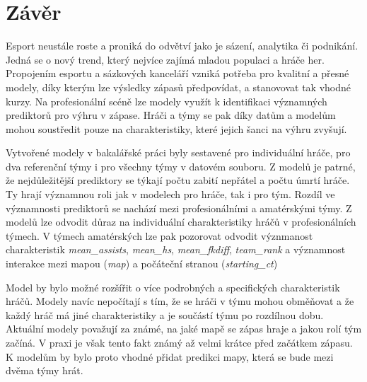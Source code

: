 \chapter{Závěr}
Esport neustále roste a proniká do odvětví jako je sázení, analytika či podnikání. Jedná se o nový trend, který nejvíce zajímá  mladou populaci a hráče her.
Propojením esportu a sázkových kanceláří vzniká potřeba pro kvalitní a přesné modely, díky kterým lze výsledky zápasů předpovídat, a stanovovat tak
vhodné kurzy. Na profesionální scéně lze modely využít k identifikaci významných prediktorů pro výhru v zápase. Hráči a týmy se pak díky datům a modelům mohou soustředit
pouze na charakteristiky, které jejich šanci na výhru zvyšují.

Vytvořené modely v bakalářské práci byly sestavené pro individuální hráče, pro dva referenční týmy i pro všechny týmy v datovém souboru. Z modelů
je patrné, že nejdůležitější prediktory se týkají počtu zabití nepřátel a počtu úmrtí hráče. Ty hrají významnou roli jak v modelech pro hráče, tak i pro tým. Rozdíl ve
významnosti prediktorů se nachází mezi profesionálními a amatérskými týmy. Z modelů lze odvodit důraz na individuální charakteristiky hráčů v profesionálních týmech. V
týmech amatérských lze pak pozorovat odvodit význmanost charakteristik \textit{mean\_assists}, \textit{mean\_hs}, \textit{mean\_fkdiff}, \textit{team\_rank} a významnost
interakce mezi mapou (\textit{map}) a počáteční stranou (\textit{starting\_ct})

Model by bylo možné rozšířit o více podrobných a specifických charakteristik hráčů. Modely navíc nepočítají s tím, že se hráči v týmu mohou obměňovat a že každý hráč má jiné
charakteristiky a je součástí týmu po rozdílnou dobu. Aktuální modely považují za známé, na jaké mapě se zápas hraje a jakou rolí tým začíná. V praxi je však tento fakt známý
až velmi krátce před začátkem zápasu. K modelům by bylo proto vhodné přidat predikci mapy, která se bude mezi dvěma týmy hrát.